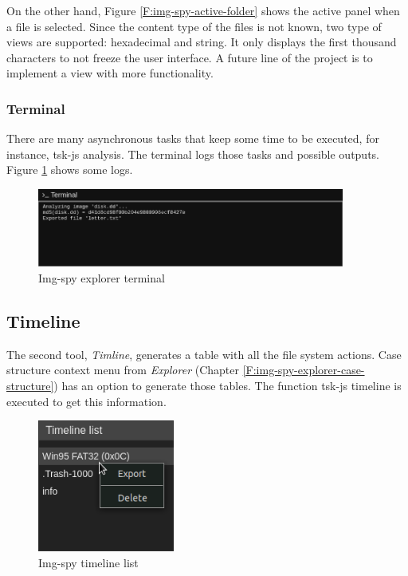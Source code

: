 On the other hand, Figure \ref{F:img-spy-active-folder} shows the active panel
when a file is selected. Since the content type of the files is not known,
two type of views are supported: hexadecimal and string. It only displays
the first thousand characters to not freeze the user interface. A future line
of the project is to implement a view with more functionality.

\subsubsection{Terminal}

There are many asynchronous tasks that keep some time to be executed, for 
instance, tsk-js analysis. The terminal logs those tasks and possible outputs.
Figure \ref{F:img-spy-explorer-terminal} shows some logs.


\begin{figure}[htb]
	\begin{center}
		\includegraphics[width=0.9\textwidth]
		{./figures/explorer-terminal.png}
		\caption{Img-spy explorer terminal}
		\label{F:img-spy-explorer-terminal}
	\end{center}
\end{figure}

\subsection{Timeline}
\label{S:timeline}

The second tool, \textit{Timline}, generates a table with all the file system
actions. Case structure context menu from \textit{Explorer} (Chapter
\ref{F:img-spy-explorer-case-structure}) has an option to generate those
tables. The function tsk-js timeline is executed to get this information.

\begin{figure}
	\includegraphics[width=4.5cm]
	{./figures/timeline-list.png}
	\centering
	\caption{Img-spy timeline list}
	\label{F:img-spy-timeline-list}
\end{figure}

